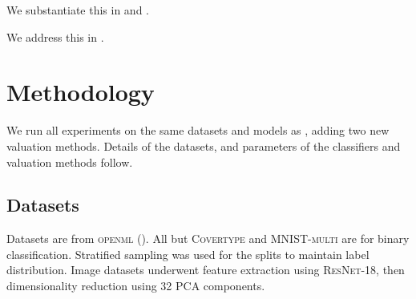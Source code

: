 \documentclass[10pt]{article}
\newcommand{\tmname}[1]{\textsc{#1}}
\begin{document}
{}

We substantiate this in  and .

{}

We address this in .

\section{Methodology}

We run all experiments on the same datasets and models as
{\cite{schoch_csshapley_2022}}, adding two new valuation methods. Details of
the datasets, and parameters of the classifiers and valuation methods follow.

\subsection{Datasets}

Datasets are from {\tmname{openml}} ({\cite{vanschoren_openml_2013}}). All
but {\tmname{Covertype}} and {\tmname{MNIST-multi}} are for binary
classification. Stratified sampling was used for the splits to maintain label
distribution. Image datasets underwent feature extraction using
{\tmname{ResNet-18}}, then dimensionality reduction using 32 PCA components.
\end{document}
